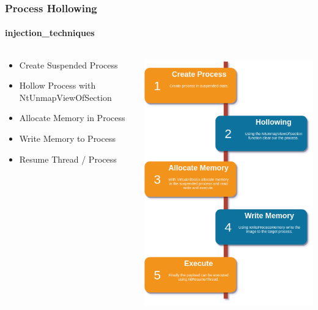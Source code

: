 \documentclass[aspectratio=169]{beamer}
\begin{document}
\begin{frame}
  \frametitle{Process Hollowing}
  \framesubtitle{injection\_techniques}
  \begin{columns}
    \begin{column}{.5\textwidth}
      \begin{itemize}
      \item{Create Suspended Process}
      \item{Hollow Process with NtUnmapViewOfSection}
      \item{Allocate Memory in Process}
      \item{Write Memory to Process}
      \item{Resume Thread / Process}
      \end{itemize}
    \end{column}
    \hfill
    \begin{column}{.5\textwidth}
      \begin{center}
        \includegraphics[scale=0.35]{process-hollowing}
      \end{center}
    \end{column}
  \end{columns}
\end{frame}
\end{document}
